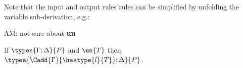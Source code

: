 Note that the input and output rules rules can be simplified by unfolding the variable sub-derivation, e.g.:
\begin{mathpar}
\end{mathpar}
\begin{metanote}
  AM: not sure about \textbf{un}
\end{metanote}
\begin{lemma}
  If \( \types{\Gamma; \Delta}{P} \) and \( \un{T} \) then \( \types{\Cadd{\Gamma}{\hastype{l}{T}};\Delta}{P} \).
\end{lemma}



